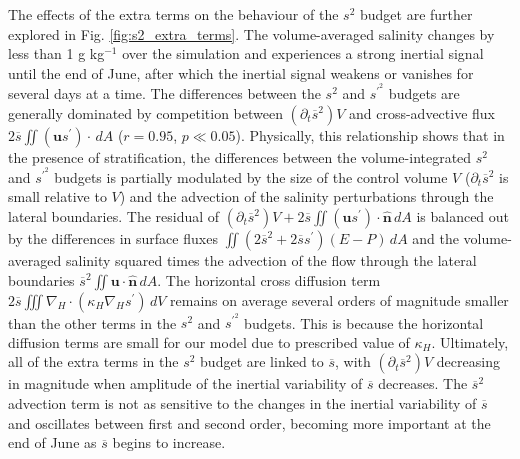 The effects of the extra terms on the behaviour of the $s^2$ budget are further explored in Fig. \ref{fig:s2_extra_terms}. The volume-averaged salinity changes by less than 1 g kg$^{-1}$ over the simulation and experiences a strong inertial signal until the end of June, after which the inertial signal weakens or vanishes for several days at a time. The differences between the $s^2$ and $s^{\prime^2}$ budgets are generally dominated by competition between $(\partial_t \overline{s}^2)V$ and cross-advective flux $2 \overline{s} \iint (\mathbf{u}s^\prime) \cdot \, dA$ ($r = 0.95$, $p \ll 0.05$). Physically, this relationship shows that in the presence of stratification, the differences between the volume-integrated $s^2$ and $s^{\prime^2}$ budgets is partially modulated by the size of the control volume $V$ ($\partial_t \overline{s}^2$ is small relative to $V$) and the advection of the salinity perturbations through the lateral boundaries. The residual of $(\partial_t \overline{s}^2)V+2 \overline{s} \iint (\mathbf{u}s^\prime) \cdot \hat{\mathbf{n}} \, dA$ is balanced out by the differences in surface fluxes $\iint (2 \overline{s}^2 + 2 \overline{s} s^\prime)(E-P) \, dA$ and the volume-averaged salinity squared times the advection of the flow through the lateral boundaries $\overline{s}^2 \iint \mathbf{u} \cdot \hat{\mathbf{n}} \, dA$. The horizontal cross diffusion term $2 \overline{s} \iiint \nabla_H \cdot (\kappa_H \nabla_H s^{\prime}) \, dV$ remains on average several orders of magnitude smaller than the other terms in the $s^2$ and $s^{\prime^2}$ budgets. This is because the horizontal diffusion terms are small for our model due to prescribed value of $\kappa_H$. Ultimately, all of the extra terms in the $s^2$ budget are linked to $\overline{s}$, with $(\partial_t \overline{s}^2)V$ decreasing in magnitude when amplitude of the inertial variability of $\overline{s}$ decreases. The $\overline{s}^2$ advection term is not as sensitive to the changes in the inertial variability of $\overline{s}$ and oscillates between first and second order, becoming more important at the end of June as $\overline{s}$ begins to increase.

